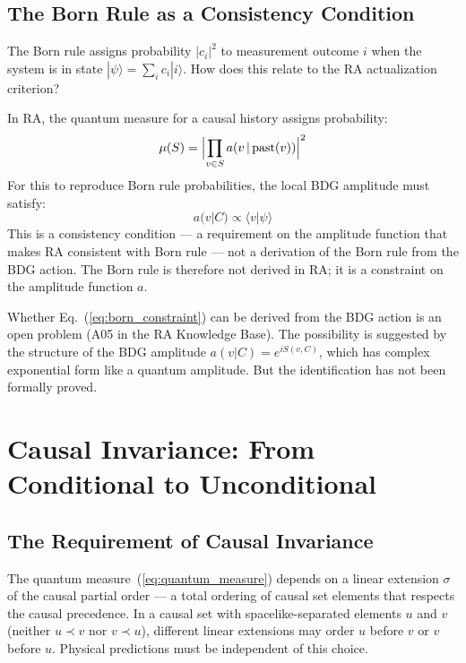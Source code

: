 \documentclass[12pt,a4paper]{article}
\begin{document}
\subsection{The Born Rule as a Consistency Condition}

The Born rule assigns probability $|c_i|^2$ to measurement outcome $i$ when the system is in state $|\psi\rangle=\sum_i c_i|i\rangle$.  How does this relate to the RA actualization criterion?

In RA, the quantum measure for a causal history assigns probability:
\begin{equation}
  \mu(S) = \Bigl|\prod_{v\in S} a(v\,|\,\mathrm{past}(v))\Bigr|^2
  \label{eq:quantum_measure}
\end{equation}
For this to reproduce Born rule probabilities, the local BDG amplitude must satisfy:
\begin{equation}
  a(v|C) \propto \langle v|\psi\rangle
  \label{eq:born_constraint}
\end{equation}
This is a consistency condition --- a requirement on the amplitude function that makes RA consistent with Born rule --- not a derivation of the Born rule from the BDG action.  The Born rule is therefore not derived in RA; it is a constraint on the amplitude function $a$.

Whether Eq.~(\ref{eq:born_constraint}) can be derived from the BDG action is an open problem (A05 in the RA Knowledge Base).  The possibility is suggested by the structure of the BDG amplitude $a(v|C)=e^{iS(v,C)}$, which has complex exponential form like a quantum amplitude.  But the identification has not been formally proved.


\section{Causal Invariance: From Conditional to Unconditional}\label{sec:causal_inv}

\subsection{The Requirement of Causal Invariance}

The quantum measure~(\ref{eq:quantum_measure}) depends on a linear extension $\sigma$ of the causal partial order --- a total ordering of causal set elements that respects the causal precedence.  In a causal set with spacelike-separated elements $u$ and $v$ (neither $u\prec v$ nor $v\prec u$), different linear extensions may order $u$ before $v$ or $v$ before $u$.  Physical predictions must be independent of this choice.
\end{document}
